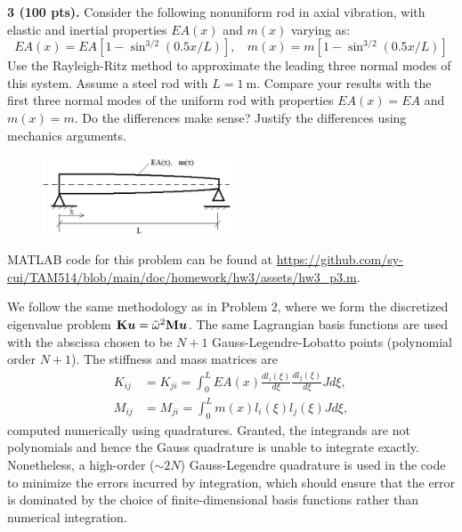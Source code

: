 \newpage
\begin{problem}
    \textbf{3 (100 pts).} Consider the following nonuniform rod in axial vibration, with elastic and inertial properties $EA(x)$ and $m(x)$ varying as:
    \begin{equation}
        EA(x) = EA\left[1 - \sin^{3/2}(0.5x/L) \right], ~~~~ m(x) = m\left[1 - \sin^{3/2}(0.5x/L) \right]
    \end{equation}
    Use the Rayleigh-Ritz method to approximate the leading three normal modes of this system.
    Assume a steel rod with $L=\qty{1}{\m}$. 
    Compare your results with the first three normal modes of the uniform rod with properties $EA(x) = EA$ and $m(x) = m$. 
    Do the differences make sense? 
    Justify the differences using mechanics arguments.  
\end{problem}
\begin{figure}[!ht]
    \centering
    \includegraphics[width=0.5\textwidth]{homework/hw3/assets/hw3_p3.png}
\end{figure}

MATLAB code for this problem can be found at \url{https://github.com/sy-cui/TAM514/blob/main/doc/homework/hw3/assets/hw3_p3.m}.

We follow the same methodology as in Problem 2, where we form the discretized eigenvalue problem $\mathbf{K} \bm{u} = \tilde{\omega}^2 \mathbf{M} \bm{u}$. 
The same Lagrangian basis functions are used with the abscissa chosen to be $N + 1$ Gauss-Legendre-Lobatto points (polynomial order $N + 1$). 
The stiffness and mass matrices are 
\begin{equation}
\begin{aligned}
    K_{ij} &= K_{ji} = \int_0^L EA(x) \frac{dl_i(\xi)}{d\xi} \frac{dl_j(\xi)}{d\xi} J d\xi, \\
    M_{ij} &= M_{ji} = \int_0^L m(x) l_i(\xi) l_j(\xi) J d\xi,
\end{aligned}
\end{equation}
computed numerically using quadratures. 
Granted, the integrands are not polynomials and hence the Gauss quadrature is unable to integrate exactly. 
Nonetheless, a high-order ($\sim 2N$) Gauss-Legendre quadrature is used in the code to minimize the errors incurred by integration, which should ensure that the error is dominated by the choice of finite-dimensional basis functions rather than numerical integration. 

